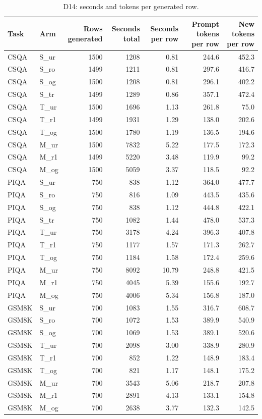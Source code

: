 \begin{table}[t]
\centering
\small
\caption{D14: seconds and tokens per generated row.}
\label{tab:d14-cost}
\begin{tabular}{llrrrrr}
\toprule
Task & Arm & Rows generated & Seconds total & Seconds per row & Prompt tokens per row & New tokens per row \\
\midrule
CSQA & S\_ur & 1500 & 1208 & 0.81 & 244.6 & 452.3 \\
CSQA & S\_ro & 1499 & 1211 & 0.81 & 297.6 & 416.7 \\
CSQA & S\_og & 1500 & 1208 & 0.81 & 296.1 & 402.2 \\
CSQA & S\_tr & 1499 & 1289 & 0.86 & 357.1 & 472.4 \\
CSQA & T\_ur & 1500 & 1696 & 1.13 & 261.8 & 75.0 \\
CSQA & T\_r1 & 1499 & 1931 & 1.29 & 138.0 & 202.6 \\
CSQA & T\_og & 1500 & 1780 & 1.19 & 136.5 & 194.6 \\
CSQA & M\_ur & 1500 & 7832 & 5.22 & 177.5 & 172.3 \\
CSQA & M\_r1 & 1499 & 5220 & 3.48 & 119.9 & 99.2 \\
CSQA & M\_og & 1500 & 5059 & 3.37 & 118.5 & 92.2 \\
PIQA & S\_ur & 750 & 838 & 1.12 & 364.0 & 477.7 \\
PIQA & S\_ro & 750 & 816 & 1.09 & 443.5 & 435.6 \\
PIQA & S\_og & 750 & 838 & 1.12 & 444.8 & 422.1 \\
PIQA & S\_tr & 750 & 1082 & 1.44 & 478.0 & 537.3 \\
PIQA & T\_ur & 750 & 3178 & 4.24 & 396.3 & 407.8 \\
PIQA & T\_r1 & 750 & 1177 & 1.57 & 171.3 & 262.7 \\
PIQA & T\_og & 750 & 1184 & 1.58 & 172.4 & 259.6 \\
PIQA & M\_ur & 750 & 8092 & 10.79 & 248.8 & 421.5 \\
PIQA & M\_r1 & 750 & 4045 & 5.39 & 155.6 & 192.7 \\
PIQA & M\_og & 750 & 4006 & 5.34 & 156.8 & 187.0 \\
GSM8K & S\_ur & 700 & 1083 & 1.55 & 316.7 & 608.7 \\
GSM8K & S\_ro & 700 & 1072 & 1.53 & 389.9 & 540.9 \\
GSM8K & S\_og & 700 & 1069 & 1.53 & 389.1 & 520.6 \\
GSM8K & T\_ur & 700 & 2098 & 3.00 & 338.9 & 280.9 \\
GSM8K & T\_r1 & 700 & 852 & 1.22 & 148.9 & 183.4 \\
GSM8K & T\_og & 700 & 821 & 1.17 & 148.1 & 175.2 \\
GSM8K & M\_ur & 700 & 3543 & 5.06 & 218.7 & 207.8 \\
GSM8K & M\_r1 & 700 & 2891 & 4.13 & 133.1 & 154.8 \\
GSM8K & M\_og & 700 & 2638 & 3.77 & 132.3 & 142.5 \\
\bottomrule
\end{tabular}
\end{table}
